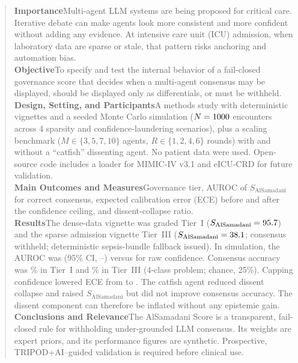 \documentclass[11pt]{article}
\newcommand{\Sal}{S_{\mathrm{AlSamadani}}}
\begin{document}
\begin{abstract}
\small
\noindent\textbf{Importance}\enspace Multi-agent LLM systems are being proposed for critical care. Iterative debate can
make agents look more consistent and more confident without adding any evidence. At intensive care unit (ICU) admission,
when laboratory data are sparse or stale, that pattern risks anchoring and automation bias.\\
\textbf{Objective}\enspace To specify and test the internal behavior of a fail-closed governance score that decides
when a multi-agent consensus may be displayed, should be displayed only as differentials, or must be withheld.\\
\textbf{Design, Setting, and Participants}\enspace A methods study with deterministic vignettes and a seeded Monte Carlo
simulation ($N=\MCN$ encounters across 4 sparsity and confidence-laundering scenarios), plus a scaling benchmark
($M\in\{3,5,7,10\}$ agents, $R\in\{1,2,4,6\}$ rounds) with and without a ``catfish'' dissenting agent.
No patient data were used. Open-source code includes a loader for MIMIC-IV v3.1 and eICU-CRD for future validation.\\
\textbf{Main Outcomes and Measures}\enspace Governance tier, AUROC of $\Sal$ for correct consensus, expected calibration error (ECE)
before and after the confidence ceiling, and dissent-collapse ratio.\\
\textbf{Results}\enspace The dense-data vignette was graded Tier~I ($\Sal=\CaseAScore$) and the sparse admission vignette
Tier~III ($\Sal=\CaseBScore$; consensus withheld; deterministic sepsis-bundle fallback issued). In simulation, the AUROC was
\MCAUROC{} (95\% CI, \MCAUROCLo--\MCAUROCHi) versus \MCAUROCConf{} for raw confidence. Consensus accuracy was
\MCTierOneAcc\% in Tier~I and \MCTierThreeAcc\% in Tier~III (4-class problem; chance, 25\%). Capping confidence lowered
ECE from \MCECERaw{} to \MCECECapped. The catfish agent reduced dissent collapse and raised $\Sal$ but did
not improve consensus accuracy. The dissent component can therefore be inflated without any epistemic gain.\\
\textbf{Conclusions and Relevance}\enspace The AlSamadani Score is a transparent, fail-closed rule for withholding
under-grounded LLM consensus. Its weights are expert priors, and its performance figures are synthetic.
Prospective, TRIPOD+AI--guided validation is required before clinical use.
\end{abstract}
\end{document}
